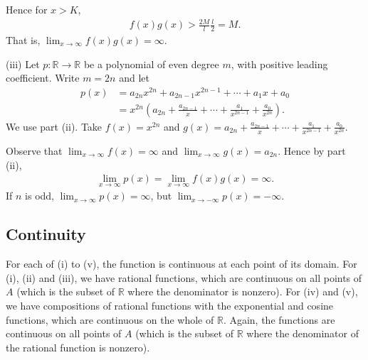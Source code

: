 \documentclass[letterpaper,10pt,english]{jupyterBook}
\begin{document}
Hence for \(x>K\),
\begin{equation*}
\begin{split}
f(x)g(x) > \frac{2M}{l}\frac{l}{2} = M.
\end{split}
\end{equation*}
\sphinxAtStartPar
That is, \(\lim_{x\rightarrow\infty}f(x)g(x) = \infty\).

\sphinxAtStartPar
(iii) Let \(p:\mathbb{R}\to\mathbb{R}\) be a polynomial of even degree \(m\), with positive leading coefficient. Write \(m = 2n\) and let
\begin{align*}
p(x) &= a_{2n}x^{2n} + a_{2n-1}x^{2n-1} + \cdots + a_{1}x + a_{0}\\
&= x^{2n}\left(a_{2n} + \frac{a_{2n-1}}{x} + \cdots + \frac{a_{1}}{x^{2n-1}} + \frac{a_{0}}{x^{2n}}\right). 
\end{align*}
\sphinxAtStartPar
We use part (ii). Take \(f(x) = x^{2n}\) and \(\displaystyle g(x) = a_{2n} + \frac{a_{2n-1}}{x} + \cdots + \frac{a_{1}}{x^{2n-1}} + \frac{a_{0}}{x^{2n}}\).

Observe that \(\displaystyle\lim_{x \rightarrow \infty}f(x) = \infty\) and \(\displaystyle\lim_{x \rightarrow \infty}g(x) = a_{2n}\). Hence by part (ii),
\begin{equation*}
\begin{split}
\lim_{x \rightarrow \infty}p(x) = \lim_{x \rightarrow \infty}f(x)g(x) = \infty.
\end{split}
\end{equation*}
\sphinxAtStartPar
If \(n\) is odd, \(\lim_{x \rightarrow \infty}p(x) = \infty\), but \(\lim_{x \rightarrow -\infty}p(x) = -\infty\).


\subsection{Continuity}
\label{\detokenize{Solutions-full:continuity}}\label{\detokenize{Solutions-full:ch3sol}}
\sphinxAtStartPar
{\hyperref[\detokenize{Problems:id13}]{}} For each of (i) to (v), the function is continuous at each point of its domain. For (i), (ii) and (iii), we have rational functions, which are continuous on all points of \(A\) (which is the subset of \(\mathbb{R}\) where the denominator is non\sphinxhyphen{}zero). For (iv) and (v), we have compositions of rational functions with the exponential and cosine functions, which are continuous on the whole of \(\mathbb{R}\). Again, the functions are continuous on all points of \(A\) (which is the subset of \(\mathbb{R}\) where the denominator of the rational function is non\sphinxhyphen{}zero).
\end{document}
